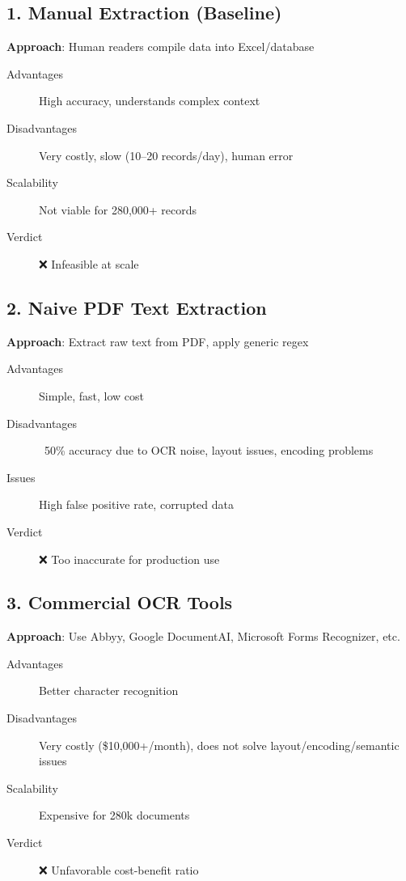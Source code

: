 \documentclass[12pt,a4paper]{report}
\begin{document}
\subsection{1. Manual Extraction (Baseline)}

\textbf{Approach}: Human readers compile data into Excel/database

\begin{description}
    \item[Advantages] High accuracy, understands complex context
    \item[Disadvantages] Very costly, slow (10--20 records/day), human error
    \item[Scalability] Not viable for 280,000+ records
    \item[Verdict] ❌ Infeasible at scale
\end{description}

\subsection{2. Naive PDF Text Extraction}

\textbf{Approach}: Extract raw text from PDF, apply generic regex

\begin{description}
    \item[Advantages] Simple, fast, low cost
    \item[Disadvantages] ~50\% accuracy due to OCR noise, layout issues, encoding problems
    \item[Issues] High false positive rate, corrupted data
    \item[Verdict] ❌ Too inaccurate for production use
\end{description}

\subsection{3. Commercial OCR Tools}

\textbf{Approach}: Use Abbyy, Google DocumentAI, Microsoft Forms Recognizer, etc.

\begin{description}
    \item[Advantages] Better character recognition
    \item[Disadvantages] Very costly (\$10,000+/month), does not solve layout/encoding/semantic issues
    \item[Scalability] Expensive for 280k documents
    \item[Verdict] ❌ Unfavorable cost-benefit ratio
\end{description}
\end{document}
